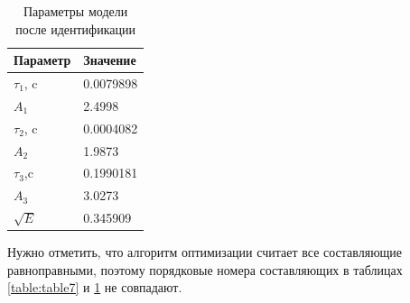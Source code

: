 \documentclass{report}
\begin{document}
        \begin{table}[ht]
            \caption{Параметры модели после идентификации}
            \label{table:table8}
            \centering
            \begin{tabular}{ | l | l | }
                \hline
                Параметр & Значение \\
                \hline
                $\tau_1$, c & 0.0079898 \\
                $A_1$ & 2.4998 \\
                \hline
                $\tau_2$, c & 0.0004082 \\
                $A_2$ & 1.9873 \\
                \hline
                $\tau_3$,c & 0.1990181 \\
                $A_3$ & 3.0273 \\
                \hline
                $\sqrt{E}$ & 0.345909 \\
                \hline
            \end{tabular}
        \end{table}


        Нужно отметить, что алгоритм оптимизации считает все составляющие равноправными, 
        поэтому порядковые номера составляющих в таблицах \ref{table:table7} и 
        \ref{table:table8} не совпадают.
\end{document}
